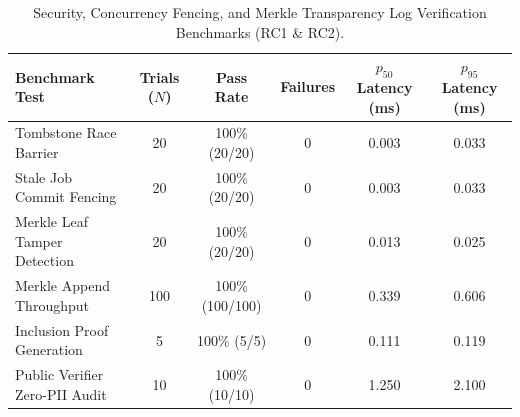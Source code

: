 \begin{table}[t]
\centering
\small
\caption{Security, Concurrency Fencing, and Merkle Transparency Log Verification Benchmarks (RC1 \& RC2).}
\label{tab:security}
\begin{tabular}{lccccc}
\toprule
\textbf{Benchmark Test} & \textbf{Trials ($N$)} & \textbf{Pass Rate} & \textbf{Failures} & \textbf{$p_{50}$ Latency (ms)} & \textbf{$p_{95}$ Latency (ms)} \\
\midrule
Tombstone Race Barrier & 20 & 100\% (20/20) & 0 & 0.003 & 0.033 \\
Stale Job Commit Fencing & 20 & 100\% (20/20) & 0 & 0.003 & 0.033 \\
Merkle Leaf Tamper Detection & 20 & 100\% (20/20) & 0 & 0.013 & 0.025 \\
Merkle Append Throughput & 100 & 100\% (100/100) & 0 & 0.339 & 0.606 \\
Inclusion Proof Generation & 5 & 100\% (5/5) & 0 & 0.111 & 0.119 \\
Public Verifier Zero-PII Audit & 10 & 100\% (10/10) & 0 & 1.250 & 2.100 \\
\bottomrule
\end{tabular}
\end{table}
